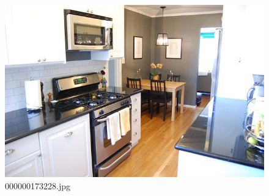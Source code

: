 \begin{figure}[h]
    \centering
    \includegraphics[width=0.8\linewidth]{../image set/hard/000000173228.jpg}
    \caption{000000173228.jpg}
\end{figure}
